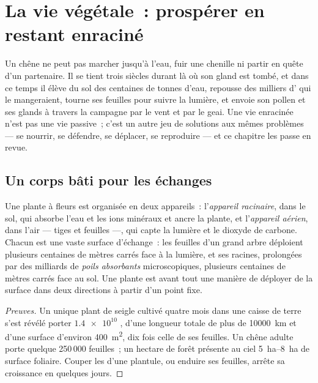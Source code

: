\chapter{La vie végétale~: prospérer en restant enraciné}\label{ch:g12:plant-rooted-life}

Un chêne ne peut pas marcher jusqu'à l'eau, fuir une chenille ni
partir en quête d'un partenaire. Il se tient trois siècles durant là
où son gland est tombé, et dans ce temps il élève du sol des centaines
de tonnes d'eau, repousse des milliers d' qui le mangeraient,
tourne ses feuilles pour suivre la lumière, et envoie son pollen et
ses glands à travers la campagne par le vent et par le geai. Une vie
enracinée n'est pas une vie passive~; c'est un autre jeu de solutions
aux mêmes problèmes --- se nourrir, se défendre, se déplacer, se
reproduire --- et ce chapitre les passe en revue.

\section{Un corps bâti pour les échanges}

\begin{proposition}\label{prop:g12:plant-rooted-life:surfaces}
Une plante à fleurs est organisée en deux appareils~: l'\emph{appareil
racinaire}, dans le sol, qui absorbe l'eau et les ions minéraux et
ancre la plante, et l'\emph{appareil aérien}, dans l'air --- tiges et
feuilles ---, qui capte la lumière et le dioxyde de carbone. Chacun
est une vaste surface d'échange~: les feuilles d'un grand arbre
déploient plusieurs centaines de mètres carrés face à la lumière, et
ses racines, prolongées par des milliards de \emph{poils
absorbants} microscopiques, plusieurs centaines
de mètres carrés face au sol. Une plante est avant tout une manière de
déployer de la surface dans deux directions à partir d'un point fixe.
\end{proposition}
\begin{proof}[Preuves]
Un unique plant de seigle cultivé quatre mois dans une caisse de terre
s'est révélé porter $\num{1.4e10}$ , d'une longueur
totale de plus de \qty{10000}{km} et d'une surface d'environ
\qty{400}{m^2}, dix fois celle de ses feuilles. Un chêne adulte porte
quelque 250\,000 feuilles~; un hectare de forêt présente au ciel
\qtyrange{5}{8}{ha} de surface foliaire. Couper les 
d'une plantule, ou enduire ses feuilles, arrête sa croissance en
quelques jours.
\end{proof}

